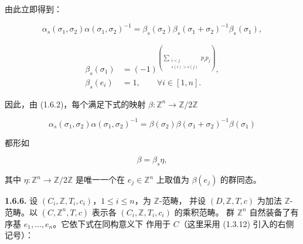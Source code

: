 \clearpage
{}%
由此立即得到：

\begin{equation*}
  \alpha_s(\sigma_1,\sigma_2)\alpha(\sigma_1,\sigma_2)^{-1}
  =\beta_s(\sigma_2)\beta_s(\sigma_1+\sigma_2)^{-1}\beta_s(\sigma_1),
\end{equation*}

\begin{equation}
  \begin{aligned}
    \beta_s(\sigma_1)
      &=(-1)^{\left(
          \sum_{\substack{i<j\\s(i)>s(j)}}p_i p_j
        \right)},\\
    \beta_s(e_i)&=1,
      \qquad \forall i\in[1,n].
  \end{aligned}
  \tag{1.6.5.3}
\end{equation}

因此，由 (1.6.2)，每个满足下式的映射
$\beta\colon\mathbb Z^n\to\mathbb Z/2\mathbb Z$

\begin{equation}
  \alpha_s(\sigma_1,\sigma_2)\alpha(\sigma_1,\sigma_2)^{-1}
  =\beta(\sigma_2)\beta(\sigma_1+\sigma_2)^{-1}\beta(\sigma_1)
  \tag{1.6.5.4}
\end{equation}

都形如

\begin{equation}
  \beta=\beta_s\eta,
  \tag{1.6.5.5}
\end{equation}

其中 $\eta\colon\mathbb Z^n\to\mathbb Z/2\mathbb Z$ 是唯一一个在
$e_j\in\mathbb Z^n$ 上取值为 $\beta(e_j)$ 的群同态。

\noindent\textbf{1.6.6.}\quad
设 $(C_i,\mathbb Z,T_i,c_i)$，$1\leq i\leq n$，为 $\mathbb Z$-范畴，
并设 $(D,\mathbb Z,T,c)$ 为加法 $\mathbb Z$-范畴。以
$(C,\mathbb Z^n,T,c)$ 表示各 $(C_i,\mathbb Z,T_i,c_i)$ 的乘积范畴。
群 $\mathbb Z^n$ 自然装备了有序基 $e_1,\ldots,e_n$。它依下式在同构意义下
作用于 $C$（这里采用 (1.3.12) 引入的右侧记号）：

